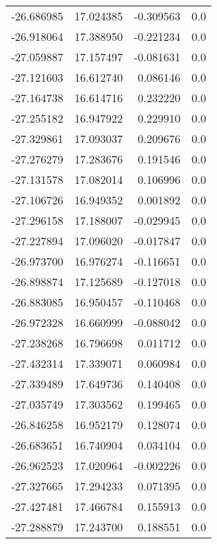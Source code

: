 \begin{tabular}{rrrr}
      -26.686985 &        17.024385 &   -0.309563 &   0.0 \\
      -26.918064 &        17.388950 &   -0.221234 &   0.0 \\
      -27.059887 &        17.157497 &   -0.081631 &   0.0 \\
      -27.121603 &        16.612740 &    0.086146 &   0.0 \\
      -27.164738 &        16.614716 &    0.232220 &   0.0 \\
      -27.255182 &        16.947922 &    0.229910 &   0.0 \\
      -27.329861 &        17.093037 &    0.209676 &   0.0 \\
      -27.276279 &        17.283676 &    0.191546 &   0.0 \\
      -27.131578 &        17.082014 &    0.106996 &   0.0 \\
      -27.106726 &        16.949352 &    0.001892 &   0.0 \\
      -27.296158 &        17.188007 &   -0.029945 &   0.0 \\
      -27.227894 &        17.096020 &   -0.017847 &   0.0 \\
      -26.973700 &        16.976274 &   -0.116651 &   0.0 \\
      -26.898874 &        17.125689 &   -0.127018 &   0.0 \\
      -26.883085 &        16.950457 &   -0.110468 &   0.0 \\
      -26.972328 &        16.660999 &   -0.088042 &   0.0 \\
      -27.238268 &        16.796698 &    0.011712 &   0.0 \\
      -27.432314 &        17.339071 &    0.060984 &   0.0 \\
      -27.339489 &        17.649736 &    0.140408 &   0.0 \\
      -27.035749 &        17.303562 &    0.199465 &   0.0 \\
      -26.846258 &        16.952179 &    0.128074 &   0.0 \\
      -26.683651 &        16.740904 &    0.034104 &   0.0 \\
      -26.962523 &        17.020964 &   -0.002226 &   0.0 \\
      -27.327665 &        17.294233 &    0.071395 &   0.0 \\
      -27.427481 &        17.466784 &    0.155913 &   0.0 \\
      -27.288879 &        17.243700 &    0.188551 &   0.0 \\

\end{tabular}
